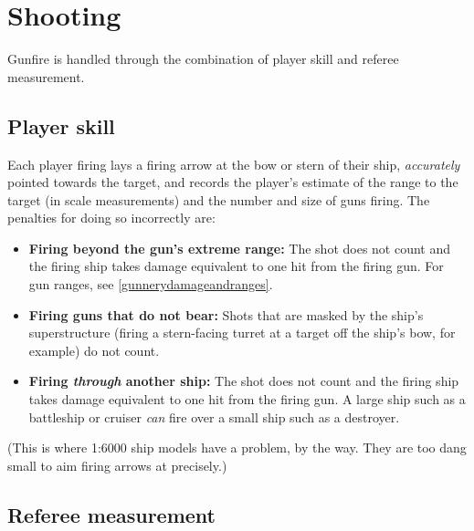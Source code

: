 \documentclass[twocolumn]{article}
\begin{document}
\section{Shooting}
\label{rule3shooting}

Gunfire is handled through the combination of player skill and referee measurement.

\subsection*{Player skill}

Each player firing lays a firing arrow at the bow or stern of their
ship, \emph{accurately} pointed towards the target, and records the
player's estimate of the range to the target (in scale measurements)
and the number and size of guns firing. The penalties for doing so
incorrectly are:
\begin{itemize}
\item \textbf{Firing beyond the gun's extreme range:} The shot does not
count and the firing ship takes damage equivalent to one hit from the
firing gun. For gun ranges, see \autoref{gunnerydamageandranges}.
\item \textbf{Firing guns that do not bear:} Shots that are masked by
the ship's superstructure (firing a stern-facing turret at a target off
the ship's bow, for example) do not count.
\item \textbf{Firing \emph{through} another ship:} The shot does not
count and the firing ship takes damage equivalent to one hit from the
firing gun. A large ship such as a battleship or cruiser \emph{can} fire
over a small ship such as a destroyer.
\end{itemize}
(This is where 1:6000 ship models have a problem, by the way. They are
too dang small to aim firing arrows at precisely.)

\subsection*{Referee measurement}
\end{document}
